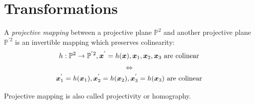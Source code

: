 \documentclass[12pt, a4paper]{report}
\begin{document}
    \section{Transformations}
    \begin{definition}
        A \emph{projective mapping} between a projective plane $\mathbb{P}^2$ and another projective plane $\mathbb{P}^{'2}$ is an invertible mapping which preserves colinearity:
        \[h:\mathbb{P}^2 \rightarrow \mathbb{P}^{'2}, \boldsymbol{x}^{'}=h(\boldsymbol{x}),\boldsymbol{x}_1,\boldsymbol{x}_2,\boldsymbol{x}_3 \textnormal{ are colinear}\]
        \[\Leftrightarrow\]
        \[\boldsymbol{x}_1^{'}=h(\boldsymbol{x}_1),\boldsymbol{x}_2^{'}=h(\boldsymbol{x}_2),\boldsymbol{x}_3^{'}=h(\boldsymbol{x}_3) \textnormal{ are colinear}\]
    \end{definition}
    Projective mapping is also called projectivity or homography. 
\end{document}
